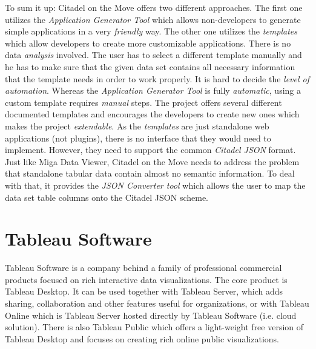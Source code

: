 To sum it up: Citadel on the Move offers two different approaches. The first one utilizes the \emph{Application Generator Tool} which allows non-developers to generate simple applications in a very \emph{friendly} way. The other one utilizes the \emph{templates} which allow developers to create more customizable applications. There is no data \emph{analysis} involved. The user has to select a different template manually and he has to make sure that the given data set contains all necessary information that the template needs in order to work properly. It is hard to decide the \emph{level of automation}. Whereas the \emph{Application Generator Tool} is fully \emph{automatic}, using a custom template requires \emph{manual} steps. The project offers several different documented templates and encourages the developers to create new ones which makes the project \emph{extendable}. As the \emph{templates} are just standalone web applications (not plugins), there is no interface that they would need to implement. However, they need to support the common \emph{Citadel JSON} format. Just like Miga Data Viewer, Citadel on the Move needs to address the problem that standalone tabular data contain almost no semantic information. To deal with that, it provides the \emph{JSON Converter tool} which allows the user to map the data set table columns onto the Citadel JSON scheme.

\section{Tableau Software}

Tableau Software \cite{tableau} is a company behind a family of professional commercial products focused on rich interactive data visualizations. The core product is Tableau Desktop. It can be used together with Tableau Server, which adds sharing, collaboration and other features useful for organizations, or with Tableau Online which is Tableau Server hosted directly by Tableau Software (i.e. cloud solution). There is also Tableau Public which offers a light-weight free version of Tableau Desktop and focuses on creating rich online public visualizations.

